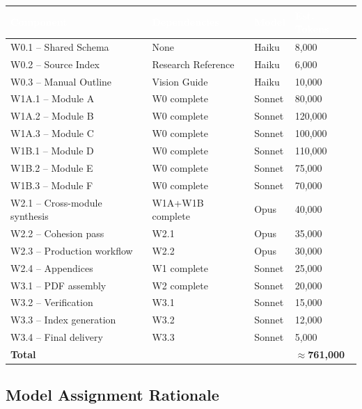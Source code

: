 \documentclass[11pt,letterpaper]{article}
\newcommand{\tableheader}[1]{\textbf{\sffamily\textcolor{white}{#1}}}
\begin{document}
\begin{center}
\begin{tabularx}{\textwidth}{L{3cm}L{3.5cm}C{2cm}C{2cm}}
\toprule
{}
\tableheader{Component} & \tableheader{Dependencies} & \tableheader{Model} & \tableheader{Est. Tokens} \\
\midrule
W0.1 -- Shared Schema & None & Haiku & 8,000 \\
W0.2 -- Source Index & Research Reference & Haiku & 6,000 \\
W0.3 -- Manual Outline & Vision Guide & Haiku & 10,000 \\
W1A.1 -- Module A & W0 complete & Sonnet & 80,000 \\
W1A.2 -- Module B & W0 complete & Sonnet & 120,000 \\
W1A.3 -- Module C & W0 complete & Sonnet & 100,000 \\
W1B.1 -- Module D & W0 complete & Sonnet & 110,000 \\
W1B.2 -- Module E & W0 complete & Sonnet & 75,000 \\
W1B.3 -- Module F & W0 complete & Sonnet & 70,000 \\
W2.1 -- Cross-module synthesis & W1A+W1B complete & Opus & 40,000 \\
W2.2 -- Cohesion pass & W2.1 & Opus & 35,000 \\
W2.3 -- Production workflow & W2.2 & Opus & 30,000 \\
W2.4 -- Appendices & W1 complete & Sonnet & 25,000 \\
W3.1 -- PDF assembly & W2 complete & Sonnet & 20,000 \\
W3.2 -- Verification & W3.1 & Sonnet & 15,000 \\
W3.3 -- Index generation & W3.2 & Sonnet & 12,000 \\
W3.4 -- Final delivery & W3.3 & Sonnet & 5,000 \\
\midrule
{}
\textbf{Total} & & & \textbf{$\approx$761,000} \\
\bottomrule
\end{tabularx}
\end{center}

\subsection{Model Assignment Rationale}
\end{document}

